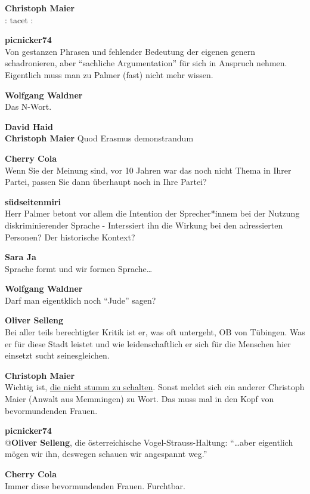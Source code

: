\documentclass[a4,parindent=0pt]{article}
\begin{document}
\textbf{Christoph Maier}\\
\textbar{}\textbar{}: tacet :\textbar{}\textbar{}

\textbf{picnicker74}\\
Von gestanzen Phrasen und fehlender Bedeutung der eigenen genern
schadronieren, aber ``sachliche Argumentation'' für sich in Anspruch
nehmen. Eigentlich muss man zu Palmer (fast) nicht mehr wissen.

\textbf{Wolfgang Waldner}\\
Das N-Wort. 🙂

\textbf{David Haid}\\
\textbf{Christoph Maier} Quod Erasmus demonstrandum

\textbf{Cherry Cola}\\
Wenn Sie der Meinung sind, vor 10 Jahren war das noch nicht Thema in
Ihrer Partei, passen Sie dann überhaupt noch in Ihre Partei?

\textbf{südseitenmiri}\\
Herr Palmer betont vor allem die Intention der Sprecher*innem bei der
Nutzung diskriminierender Sprache - Interssiert ihn die Wirkung bei den
adressierten Personen? Der historische Kontext?

\textbf{Sara Ja}\\
Sprache formt und wir formen Sprache\ldots{}

\textbf{Wolfgang Waldner}\\
Darf man eigentklich noch ``Jude'' sagen?

\textbf{Oliver Selleng}\\
Bei aller teils berechtigter Kritik ist er, was oft untergeht, OB von
Tübingen. Was er für diese Stadt leistet und wie leidenschaftlich er
sich für die Menschen hier einsetzt sucht seinesgleichen.

\textbf{Christoph Maier}\\
Wichtig ist, \hyperref[timeout]{die nicht stumm zu schalten}. Sonst meldet sich ein anderer
Christoph Maier\cite{christophmaiermdl}
(Anwalt aus Memmingen\cite{anwalt}) zu Wort. Das muss mal
in den Kopf von bevormundenden Frauen.\cite{bevormundendefrauen}

\textbf{picnicker74}\\
@\textbf{Oliver Selleng}, die österreichische Vogel-Strauss-Haltung:
``\ldots{}aber eigentlich mögen wir ihn, deswegen schauen wir angespannt
weg.''

\textbf{Cherry Cola}\\
Immer diese bevormundenden Frauen. Furchtbar.
\end{document}
